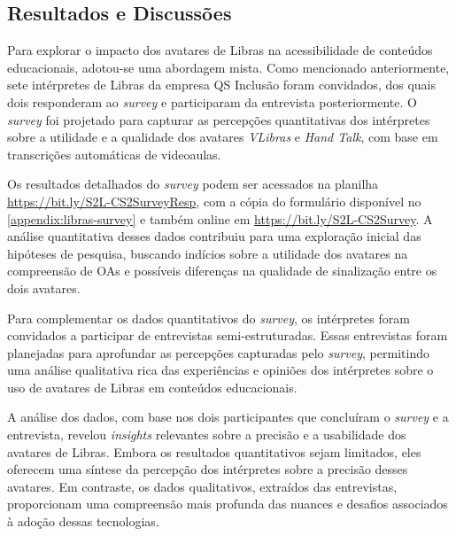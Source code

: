 \subsection{Resultados e Discussões}


Para explorar o impacto dos avatares de Libras na acessibilidade de conteúdos educacionais, adotou-se uma abordagem mista. Como mencionado anteriormente, sete intérpretes de Libras da empresa QS Inclusão foram convidados, dos quais dois responderam ao \textit{survey} e participaram da entrevista posteriormente. O \textit{survey} foi projetado para capturar as percepções quantitativas dos intérpretes sobre a utilidade e a qualidade dos avatares \textit{VLibras} e \textit{Hand Talk}, com base em transcrições automáticas de videoaulas.

Os resultados detalhados do \textit{survey} podem ser acessados na planilha \url{https://bit.ly/S2L-CS2SurveyResp}, com a cópia do formulário disponível no \autoref{appendix:libras-survey} e também online em \url{https://bit.ly/S2L-CS2Survey}. A análise quantitativa desses dados contribuiu para uma exploração inicial das hipóteses de pesquisa, buscando indícios sobre a utilidade dos avatares na compreensão de OAs e possíveis diferenças na qualidade de sinalização entre os dois avatares.

Para complementar os dados quantitativos do \textit{survey}, os intérpretes foram convidados a participar de entrevistas semi-estruturadas. Essas entrevistas foram planejadas para aprofundar as percepções capturadas pelo \textit{survey}, permitindo uma análise qualitativa rica das experiências e opiniões dos intérpretes sobre o uso de avatares de Libras em conteúdos educacionais.

A análise dos dados, com base nos dois participantes que concluíram o \textit{survey} e a entrevista, revelou \textit{insights} relevantes sobre a precisão e a usabilidade dos avatares de Libras. Embora os resultados quantitativos sejam limitados, eles oferecem uma síntese da percepção dos intérpretes sobre a precisão desses avatares. Em contraste, os dados qualitativos, extraídos das entrevistas, proporcionam uma compreensão mais profunda das nuances e desafios associados à adoção dessas tecnologias.

